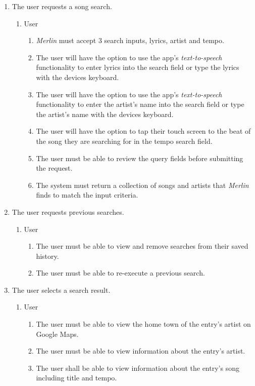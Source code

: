 \documentclass[]{article}
\newcommand{\merlin}{\textit{Merlin }}
\begin{document}
\begin{enumerate}[{BE}1.]
	\item The user requests a song search.
	\begin{enumerate}[{VP1}.1]
		\item User
			\begin{enumerate}
				\item \merlin must accept 3 search inputs, lyrics, artist and tempo.
				\item The user will have the option to use the app's \textit{text-to-speech} functionality to enter lyrics into the search field or type the lyrics with the devices keyboard.
				\item The user will have the option to use the app's \textit{text-to-speech} functionality to enter the artist's name into the search field or type the artist's name with the devices keyboard.
				\item The user will have the option to tap their touch screen to the beat of the song they are searching for in the tempo search field.
				\item The user must be able to review the query fields before submitting the request.
				\item The system must return a collection of songs and artists that \merlin finds to match the input criteria.
			\end{enumerate}
	\end{enumerate}
	\item The user requests previous searches.
	\begin{enumerate}[{VP2}.1]
		\item User
			\begin{enumerate}
				\item The user must be able to view and remove searches from their saved history.
				\item The user must be able to re-execute a previous search.
			\end{enumerate}
	\end{enumerate}
	\item The user selects a search result.
	\begin{enumerate}[{VP3}.1]
		\item User
			\begin{enumerate}
				\item The user must be able to view the home town of the entry's artist on Google Maps.
				\item The user must be able to view information about the entry's artist.
				\item The user shall be able to view information about the entry's song including title and tempo.
			\end{enumerate}
	\end{enumerate}
\end{enumerate}
\end{document}
